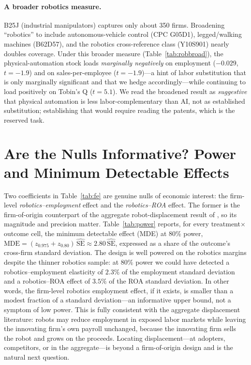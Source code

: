 \documentclass[12pt]{article}
\begin{document}
\paragraph{A broader robotics measure.} B25J (industrial manipulators) captures only about 350
firms. Broadening ``robotics'' to include autonomous-vehicle control (CPC G05D1), legged/walking
machines (B62D57), and the robotics cross-reference class (Y10S901) nearly doubles coverage. Under
this broader measure (Table~\ref{tab:robbroad}), the physical-automation stock loads
\emph{marginally negatively} on employment ($-0.029$, $t=-1.9$) and on sales-per-employee
($t=-1.9$)---a hint of labor substitution that is only marginally significant and that we hedge
accordingly---while continuing to load positively on Tobin's Q ($t=5.1$). We read the broadened
result as \emph{suggestive} that physical automation is less labor-complementary than AI, not as
established substitution; establishing that would require reading the patents, which is the
reserved task.

\section{Are the Nulls Informative? Power and Minimum Detectable Effects}\label{sec:power}
Two coefficients in Table~\ref{tab:fe} are genuine nulls of economic interest: the firm-level
\emph{robotics--employment} effect and the \emph{robotics--ROA} effect. The former is the
firm-of-origin counterpart of the aggregate robot-displacement result of \citet{acemoglu2020}, so
its magnitude and precision matter. Table~\ref{tab:power} reports, for every treatment$\times$
outcome cell, the minimum detectable effect (MDE) at 80\% power,
$\text{MDE}=(z_{0.975}+z_{0.80})\,\widehat{\text{SE}}\approx 2.80\,\widehat{\text{SE}}$, expressed
as a share of the outcome's cross-firm standard deviation. The design is well powered on the
robotics margins despite the thinner robotics sample: at 80\% power we could have detected a
robotics--employment elasticity of $2.3\%$ of the employment standard deviation and a
robotics--ROA effect of $3.5\%$ of the ROA standard deviation. In other words, the firm-level
robotics employment effect, if it exists, is smaller than a modest fraction of a standard
deviation---an informative upper bound, not a symptom of low power. This is fully consistent with
the aggregate displacement literature: robots may reduce employment in exposed labor markets while
leaving the innovating firm's own payroll unchanged, because the innovating firm sells the robot
and grows on the proceeds. Locating displacement---at adopters, competitors, or in the
aggregate---is beyond a firm-of-origin design and is the natural next question.
\end{document}
